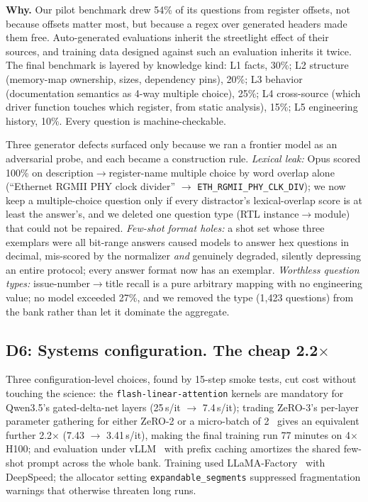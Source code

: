 \textbf{Why.} Our pilot benchmark drew 54\% of its questions from register
offsets, not because offsets matter most, but because a regex over generated
headers made them free. Auto-generated evaluations inherit the streetlight
effect of their sources, and training data designed against such an
evaluation inherits it twice. The final benchmark is layered by knowledge
kind: L1 facts, 30\%; L2 structure (memory-map ownership, sizes, dependency
pins), 20\%; L3 behavior (documentation semantics as 4-way multiple choice),
25\%; L4 cross-source (which driver function touches which register, from
static analysis), 15\%; L5 engineering history, 10\%. Every question is
machine-checkable.

Three generator defects surfaced only because we ran a frontier model as an
adversarial probe, and each became a construction rule. \emph{Lexical leak:}
Opus scored 100\% on description$\rightarrow$register-name multiple choice by
word overlap alone (``Ethernet RGMII PHY clock divider''
$\rightarrow$ \texttt{ETH\_RGMII\_PHY\_CLK\_DIV}); we now keep a
multiple-choice question only if every distractor's lexical-overlap score is
at least the answer's, and we deleted one question type (RTL
instance$\rightarrow$module) that could not be repaired. \emph{Few-shot
format holes:} a shot set whose three exemplars were all bit-range answers
caused models to answer hex questions in decimal, mis-scored by the
normalizer \emph{and} genuinely degraded, silently depressing an entire
protocol; every answer format now has an exemplar. \emph{Worthless question
types:} issue-number$\rightarrow$title recall is a pure arbitrary mapping
with no engineering value; no model exceeded 27\%, and we removed the type
(1{,}423 questions) from the bank rather than let it dominate the aggregate.

\subsection{D6: Systems configuration. The cheap 2.2$\times$}
\label{sec:d6}

Three configuration-level choices, found by 15-step smoke tests, cut cost
without touching the science: the \texttt{flash-linear-attention} kernels are
mandatory for Qwen3.5's gated-delta-net layers (25\,s/it $\rightarrow$
7.4\,s/it); trading ZeRO-3's per-layer parameter gathering for either ZeRO-2
or a micro-batch of 2~\citep{rajbhandari2019zero} gives an equivalent further
2.2$\times$ (7.43 $\rightarrow$ 3.41\,s/it), making the final training run 77
minutes on 4$\times$H100; and evaluation under
vLLM~\citep{kwon2023vllm} with prefix caching amortizes the shared few-shot
prompt across the whole bank. Training used
LLaMA-Factory~\citep{zheng2024llamafactory} with DeepSpeed; the allocator
setting \texttt{expandable\_segments} suppressed fragmentation warnings that
otherwise threaten long runs.
